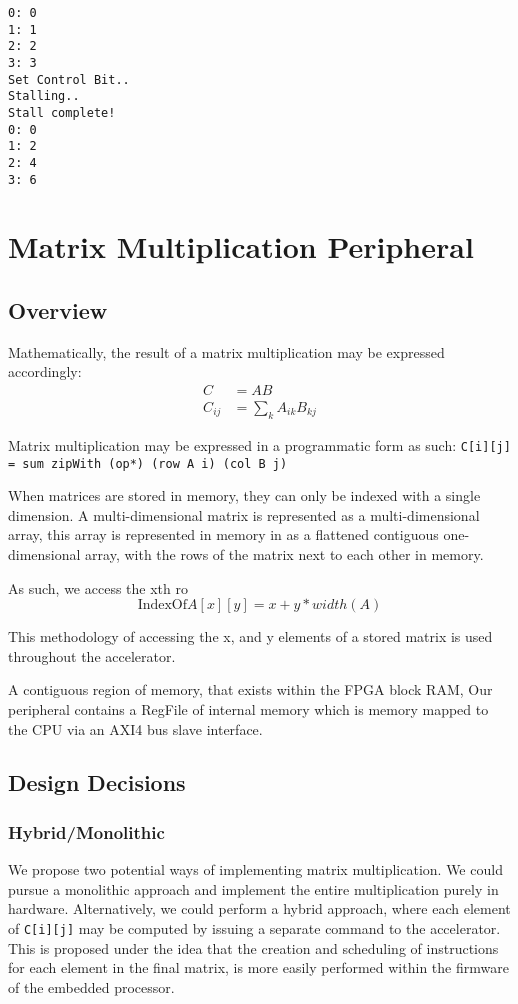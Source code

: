 \documentclass[a4paper,9pt]{report}
\begin{document}
\begin{verbatim}
0: 0
1: 1
2: 2
3: 3
Set Control Bit..
Stalling..
Stall complete!
0: 0
1: 2
2: 4
3: 6
\end{verbatim}

\section{Matrix Multiplication Peripheral}
\subsection{Overview}
Mathematically, the result of a matrix multiplication may be expressed
accordingly:
\begin{align*}
  C &= AB \\
  C_{ij} &= \sum_k A_{ik}B_{kj}
\end{align*}

Matrix multiplication may be expressed in a programmatic form as such:
\texttt{C[i][j] = sum zipWith (op*) (row A i) (col B j)}

When matrices are stored in memory, they can only be indexed with a single
dimension. A multi-dimensional matrix is represented as a multi-dimensional
array, this array is represented in memory in as a flattened contiguous
one-dimensional array, with the rows of the matrix next to each other in memory.

As such, we access the xth ro
$$ \text{IndexOf} A[x][y] = x + y * width(A) $$

This methodology of accessing the x, and y elements of a stored matrix is used
throughout the accelerator.


A contiguous region of memory, that exists within the FPGA block RAM,  
Our peripheral contains a RegFile of internal memory which is memory mapped to
the CPU via an AXI4 bus slave interface.

\subsection{Design Decisions}
\subsubsection{Hybrid/Monolithic}
We propose two potential ways of implementing matrix multiplication. We could
pursue a monolithic approach and implement the entire multiplication purely in
hardware. Alternatively, we could perform a hybrid approach, where each element
of \texttt{C[i][j]} may be computed by issuing a separate command to the
accelerator. This is proposed under the idea that the creation and scheduling of
instructions for each element in the final matrix, is more easily performed
within the firmware of the embedded processor.
\end{document}

